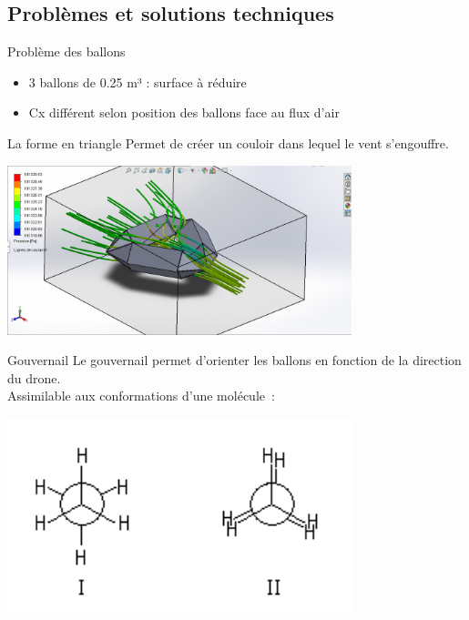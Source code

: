 \documentclass{beamer}
\begin{document}
\subsection{Problèmes et solutions techniques}
\begin{frame}{Problème des ballons}
  \begin{itemize}
	\item 3 ballons de 0.25 m³ : surface à réduire
  \item Cx différent selon position des ballons face au flux d'air
\end{itemize}
\end{frame}

\begin{frame}{La forme en triangle}
	Permet de créer un couloir dans lequel le vent s'engouffre.
  \begin{center}
		\includegraphics[width=10cm]{../Images/Capture.PNG}
	\end{center}
\end{frame}

\begin{frame}{Gouvernail}
	Le gouvernail permet d'orienter les ballons en fonction de la direction du drone.\\
  Assimilable aux conformations d'une molécule~:
  \begin{center}
		\includegraphics[width=10cm]{../Images/conformations.png}
	\end{center}
\end{frame}
\end{document}
